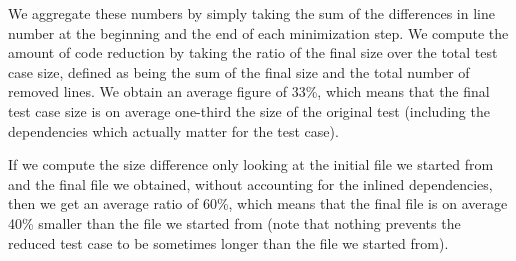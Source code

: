 \documentclass[a4paper,USenglish,cleveref,autoref,thm-restate]{lipics-v2021}
\makeatletter
\newcommand{\todo}[1]{%
\@latex@warning{TODO: \detokenize{#1} on page \thepage}%
\textcolor{red}{[\textbf{TODO:} #1]}}%
\makeatother
\begin{document}
We aggregate these numbers by simply taking the sum of the differences in line number at the beginning and the end of each minimization step. We compute the amount of code reduction by taking the ratio of the final size over the total test case size, defined as being the sum of the final size and the total number of removed lines. We obtain an average figure of 33\%, which means that the final test case size is on average one-third the size of the original test (including the dependencies which actually matter for the test case).

If we compute the size difference only looking at the initial file we started from and the final file we obtained, without accounting for the inlined dependencies, then we get an average ratio of 60\%, which means that the final file is on average 40\% smaller than the file we started from (note that nothing prevents the reduced test case to be sometimes longer than the file we started from).





\end{document}
